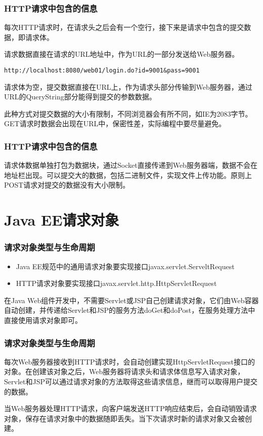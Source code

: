 \begin{frame} %
\frametitle{HTTP请求中包含的信息} 

每次HTTP请求时，在请求头之后会有一个空行，接下来是请求中包含的提交数据，即请求体。


请求数据直接在请求的URL地址中，作为URL的一部分发送给Web服务器。
\begin{verbatim}
http://localhost:8080/web01/login.do?id=9001&pass=9001
\end{verbatim}
请求体为空，提交数据直接在URL上，作为请求头部分传输到Web服务器，通过URL的QueryString部分能得到提交的参数数据。

此种方式对提交数据的大小有限制，不同浏览器会有所不同，如IE为2083字节。GET请求时数据会出现在URL中，保密性差，实际编程中要尽量避免。
\end{frame}

\begin{frame} %
\frametitle{HTTP请求中包含的信息} 


请求体数据单独打包为数据块，通过Socket直接传递到Web服务器端，数据不会在地址栏出现。可以提交大的数据，包括二进制文件，实现文件上传功能。原则上POST请求对提交的数据没有大小限制。
\end{frame}

\section{Java EE请求对象}

\begin{frame}
\frametitle{请求对象类型与生命周期} 
\begin{itemize}
\item Java EE规范中的通用请求对象要实现接口javax.servlet.ServeltRequest
\item HTTP请求对象要实现接口javax.servlet.http.HttpServletRequest
\end{itemize}


在Java Web组件开发中，不需要Servlet或JSP自己创建请求对象，它们由Web容器自动创建，并传递给Servlet和JSP的服务方法doGet和doPost，在服务处理方法中直接使用请求对象即可。
\end{frame}

\begin{frame}
\frametitle{请求对象类型与生命周期} 

每次Web服务器接收到HTTP请求时，会自动创建实现HttpServletRequest接口的对象。在创建该对象之后，Web服务器将请求头和请求体信息写入请求对象，Servlet和JSP可以通过请求对象的方法取得这些请求信息，继而可以取得用户提交的数据。


当Web服务器处理HTTP请求，向客户端发送HTTP响应结束后，会自动销毁请求对象，保存在请求对象中的数据随即丢失。当下次请求时新的请求对象又会被创建。
\end{frame}

